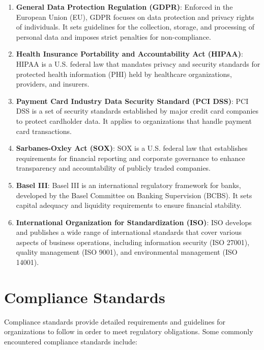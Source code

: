     \begin{enumerate}
        \item \textbf{General Data Protection Regulation (GDPR)}: Enforced in the European Union (EU), GDPR focuses on data protection and privacy rights of individuals. It sets guidelines for the collection, storage, and processing of personal data and imposes strict penalties for non-compliance.

        \item \textbf{Health Insurance Portability and Accountability Act (HIPAA)}: HIPAA is a U.S. federal law that mandates privacy and security standards for protected health information (PHI) held by healthcare organizations, providers, and insurers.

        \item \textbf{Payment Card Industry Data Security Standard (PCI DSS)}: PCI DSS is a set of security standards established by major credit card companies to protect cardholder data. It applies to organizations that handle payment card transactions.

        \item \textbf{Sarbanes-Oxley Act (SOX)}: SOX is a U.S. federal law that establishes requirements for financial reporting and corporate governance to enhance transparency and accountability of publicly traded companies.

        \item \textbf{Basel III}: Basel III is an international regulatory framework for banks, developed by the Basel Committee on Banking Supervision (BCBS). It sets capital adequacy and liquidity requirements to ensure financial stability.

        \item \textbf{International Organization for Standardization (ISO)}: ISO develops and publishes a wide range of international standards that cover various aspects of business operations, including information security (ISO 27001), quality management (ISO 9001), and environmental management (ISO 14001).
    \end{enumerate}

\section*{Compliance Standards}

Compliance standards provide detailed requirements and guidelines for organizations to follow in order to meet regulatory obligations. Some commonly encountered compliance standards include:

